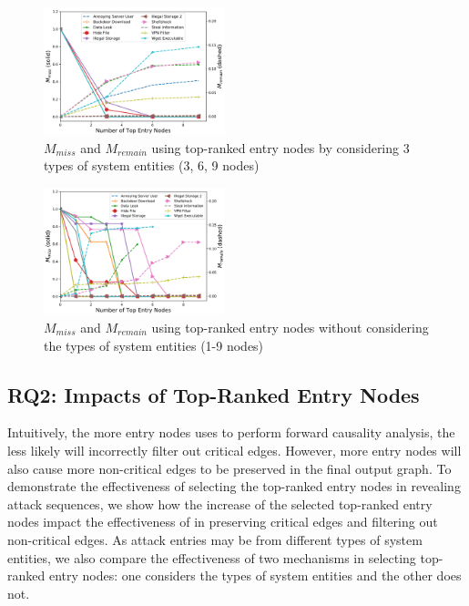 % 
% 

\begin{figure}[t]
    \centering
    \includegraphics[width=0.47\textwidth]{figs/s&p/rq2-crop.pdf}
    \caption{$M_{miss}$ and $M_{remain}$ using top-ranked entry nodes by considering 3 types of system entities (3, 6, 9 nodes)}
    \label{fig:rq2batch}
\end{figure}
\begin{figure}[t]
    \centering
    \includegraphics[width=0.47\textwidth]{figs/s&p/rq2m-crop.pdf}
    \caption{$M_{miss}$ and $M_{remain}$ using top-ranked entry nodes without considering the types of system entities (1-9 nodes)}
    \label{fig:rq2single}
\end{figure}

\subsection{RQ2: Impacts of Top-Ranked Entry Nodes}
\label{subsec:rq2}
Intuitively, the more entry nodes \tool uses to perform forward causality analysis, the less likely \tool will incorrectly filter out critical edges.
However, more entry nodes will also cause more non-critical edges to be preserved in the final output graph.
To demonstrate the effectiveness of selecting the top-ranked entry nodes in revealing attack sequences, we show how the increase of the selected top-ranked entry nodes impact the effectiveness of \tool in preserving critical edges and filtering out non-critical edges.
As attack entries may be from different types of system entities, we also compare the effectiveness of two mechanisms in selecting top-ranked entry nodes: one considers the types of system entities and the other does not.

